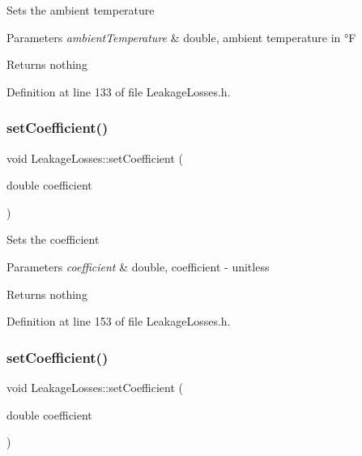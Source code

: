 Sets the ambient temperature


\begin{DoxyParams}{Parameters}
{\em ambient\+Temperature} & double, ambient temperature in °F\\
\hline
\end{DoxyParams}
\begin{DoxyReturn}{Returns}
nothing 
\end{DoxyReturn}


Definition at line 133 of file Leakage\+Losses.\+h.

\mbox{\label{class_leakage_losses_add2e96e75b6dd965370340dc03717434}} 
\subsubsection{\texorpdfstring{set\+Coefficient()}{setCoefficient()}\hspace{0.1cm}{\footnotesize\ttfamily [1/3]}}
{\footnotesize\ttfamily void Leakage\+Losses\+::set\+Coefficient (\begin{DoxyParamCaption}\item[{double}]{coefficient }\end{DoxyParamCaption})\hspace{0.3cm}{\ttfamily [inline]}}

Sets the coefficient


\begin{DoxyParams}{Parameters}
{\em coefficient} & double, coefficient -\/ unitless\\
\hline
\end{DoxyParams}
\begin{DoxyReturn}{Returns}
nothing 
\end{DoxyReturn}


Definition at line 153 of file Leakage\+Losses.\+h.

\mbox{\label{class_leakage_losses_add2e96e75b6dd965370340dc03717434}} 
\subsubsection{\texorpdfstring{set\+Coefficient()}{setCoefficient()}\hspace{0.1cm}{\footnotesize\ttfamily [2/3]}}
{\footnotesize\ttfamily void Leakage\+Losses\+::set\+Coefficient (\begin{DoxyParamCaption}\item[{double}]{coefficient }\end{DoxyParamCaption})\hspace{0.3cm}{\ttfamily [inline]}}

